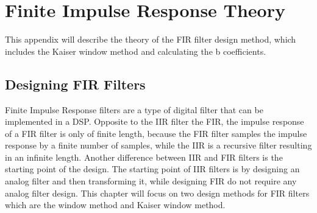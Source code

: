 \chapter{Finite Impulse Response Theory} \label{app:FIR_theory}
This appendix will describe the theory of the FIR filter design method, which includes the Kaiser window method and calculating the b coefficients.

\section{Designing FIR Filters}

Finite Impulse Response filters are a type of digital filter that can be implemented in a DSP. Opposite to the IIR filter the FIR, the impulse response of a FIR filter is only of finite length, because the FIR filter samples the impulse response by a finite number of samples, while the IIR is a recursive filter resulting in an infinite length. Another difference between IIR and FIR filters is the starting point of the design. The starting point of IIR filters is by designing an analog filter and then transforming it, while designing FIR do not require any analog filter design. This chapter will focus on two design methods for FIR filters which are the window method and Kaiser window method.

